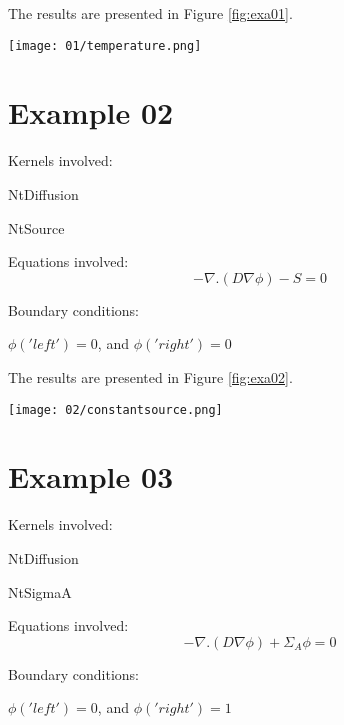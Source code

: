 \documentclass[11pt,letterpaper]{article}
\begin{document}
The results are presented in Figure \ref{fig:exa01}.
\begin{figure*}[!h]
	\centering
	\texttt{[image: 01/temperature.png]} 
	\hfill
	\caption{Temperature.}
	\label{fig:exa01}
\end{figure*}

\newpage
\section{Example 02}

Kernels involved:
\begin{description}[font=$\bullet$\scshape\bfseries]
	\item[] NtDiffusion
	\item[] NtSource
\end{description}

Equations involved:
\begin{equation}
-\nabla.(D\nabla \phi) - S=0
\end{equation}

Boundary conditions:
\begin{description}[]
	\item[] $\phi('left')=0$, and $\phi('right')=0$
\end{description}

The results are presented in Figure \ref{fig:exa02}.
\begin{figure*}[!h]
	\centering
	\texttt{[image: 02/constantsource.png]} 
	\hfill
	\caption{Flux.}
	\label{fig:exa02}
\end{figure*}

\newpage
\section{Example 03}

Kernels involved:
\begin{description}[font=$\bullet$\scshape\bfseries]
	\item[] NtDiffusion
	\item[] NtSigmaA
\end{description}

Equations involved:
\begin{equation}
-\nabla.(D\nabla \phi) + \Sigma_{A}\phi =0
\end{equation}

Boundary conditions:
\begin{description}[]
	\item[] $\phi('left')=0$, and $\phi('right')=1$
\end{description}
\end{document}
